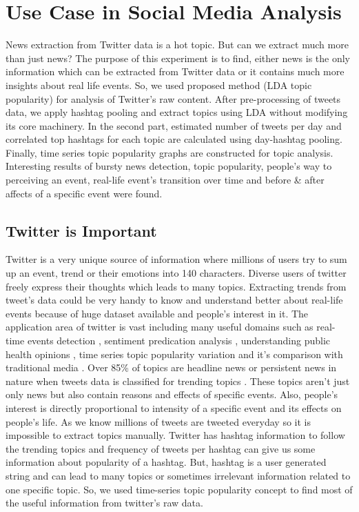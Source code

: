 \chapter{Use Case in Social Media Analysis}
News extraction from Twitter data is a hot topic. But can we extract much more than just news? The purpose of this experiment is to find, either news is the only information which can be extracted from Twitter data or it contains much more insights about real life events. So, we used proposed  method (LDA topic popularity) for analysis of Twitter’s raw content. After pre-processing of tweets data, we apply hashtag pooling and extract topics using LDA without modifying its core machinery. In the second part, estimated number of tweets per day and correlated top hashtags for each topic are calculated using day-hashtag pooling. Finally, time series topic popularity graphs are constructed for topic analysis. Interesting results of bursty news detection, topic popularity, people’s way to perceiving an event, real-life event’s transition over time and before \& after affects of a specific event were found.

\section{Twitter is Important}
Twitter is a very unique source of information where millions of users try to sum up an event, trend or their emotions into 140 characters. Diverse users of twitter freely express their thoughts which leads to many topics. Extracting trends from tweet’s data could be very handy to know and understand better about real-life events because of huge dataset available and people’s interest in it. The application area of twitter is vast including many useful domains such as real-time events detection \cite{sakaki2010earthquake}, sentiment predication analysis \cite{tumasjan2010predicting}, understanding public health opinions \cite{karami2018characterizing}, time series topic popularity variation \cite{fukuyama2018extracting} and it's comparison with traditional media \cite{zhao2011comparing}. Over 85\% of topics are headline news or persistent news in nature when tweets data is classified for trending topics  \cite{kwak2010twitter}. These topics aren't just only news but also contain reasons and effects of specific events. Also, people's interest is directly proportional to intensity of a specific event and its effects on people's life. As we know millions of tweets are tweeted everyday so it is impossible to extract topics manually. Twitter has hashtag information to follow the trending topics and frequency of tweets per hashtag can give us some information about popularity of a hashtag. But, hashtag is a user generated string and can lead to many topics or sometimes irrelevant information related to one specific topic. So, we used time-series topic popularity concept to find most of the useful information from twitter's raw data.

